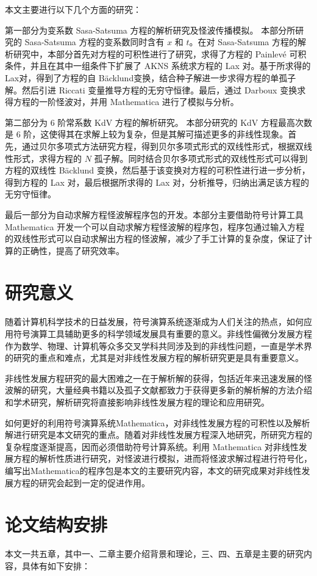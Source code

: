 本文主要进行以下几个方面的研究：

第一部分为变系数 Sasa-Satsuma 方程的解析研究及怪波传播模拟。
本部分所研究的 Sasa-Satsuma 方程的变系数同时含有 $x$ 和 $t$。在对 Sasa-Satsuma 方程的解析研究中，本部分首先对方程的可积性进行了研究，求得了方程的 Painlev\'{e} 可积条件，并且在其中一组条件下扩展了 AKNS 系统求方程的 Lax 对。基于所求得的Lax对，得到了方程的自 B\"{a}cklund变换，结合种子解进一步求得方程的单孤子解。然后引进 Riccati 变量推导方程的无穷守恒律。最后，通过 Darboux 变换求得方程的一阶怪波对，并用 Mathematica 进行了模拟与分析。

第二部分为 6 阶常系数 KdV 方程的解析研究。
本部分研究的 KdV 方程最高次数是 6 阶，这使得其在求解上较为复杂，但是其解可描述更多的非线性现象。首先，通过贝尔多项式方法研究方程，得到贝尔多项式形式的双线性形式，根据双线性形式，求得方程的 $N$ 孤子解。同时结合贝尔多项式形式的双线性形式可以得到方程的双线性 B\"{a}cklund 变换，然后基于该变换对方程的可积性进行进一步分析，得到方程的 Lax 对，最后根据所求得的 Lax 对，分析推导，归纳出满足该方程的无穷守恒律。

最后一部分为自动求解方程怪波解程序包的开发。本部分主要借助符号计算工具 Mathematica 开发一个可以自动求解方程怪波解的程序包，程序包通过输入方程的双线性形式可以自动求解出方程的怪波解，减少了手工计算的复杂度，保证了计算的正确性，提高了研究效率。

\section{研究意义}
随着计算机科学技术的日益发展，符号演算系统逐渐成为人们关注的热点，如何应用符号演算工具辅助更多的科学领域发展具有重要的意义。非线性偏微分发展方程作为数学、物理、计算机等众多交叉学科共同涉及到的非线性问题，一直是学术界的研究的重点和难点，尤其是对非线性发展方程的解析研究更是具有重要意义。

非线性发展方程研究的最大困难之一在于解析解的获得，包括近年来迅速发展的怪波解的研究，大量经典书籍以及孤子文献都致力于获得更多新的解析解的方法介绍和学术研究，解析研究将直接影响非线性发展方程的理论和应用研究。

如何更好的利用符号演算系统Mathematica，对非线性发展方程的可积性以及解析解进行研究是本文研究的重点。随着对非线性发展方程深入地研究，所研究方程的复杂程度逐渐提高，因而必须借助符号计算系统。利用 Mathematica 对非线性发展方程的解析性质进行研究，对怪波进行模拟，进而将怪波求解过程进行符号化，编写出Mathematica的程序包是本文的主要研究内容，本文的研究成果对非线性发展方程的研究会起到一定的促进作用。

\section{论文结构安排}
本文一共五章，其中一、二章主要介绍背景和理论，三、四、五章是主要的研究内容，具体有如下安排：


